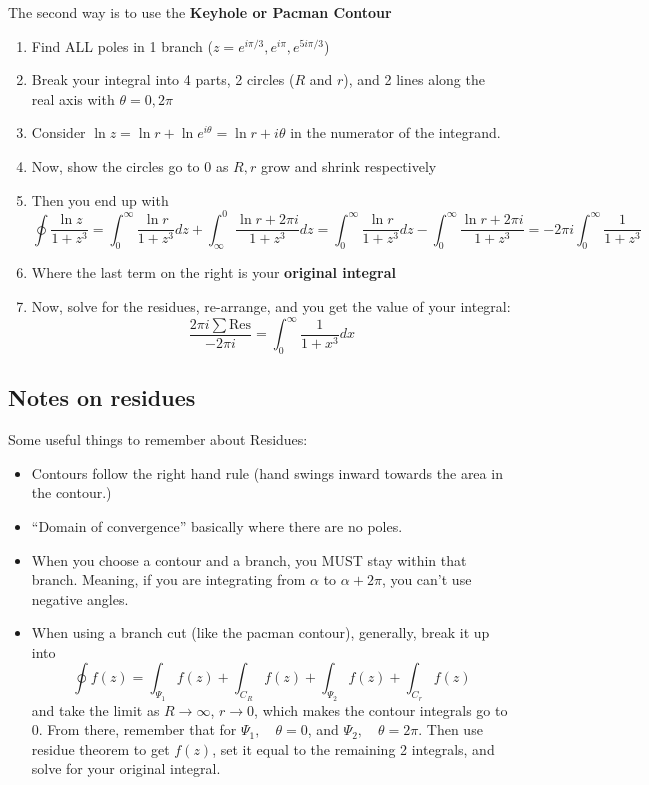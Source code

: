 \documentclass{article}
\begin{document}
The second way is to use the \textbf{Keyhole or Pacman Contour}

\begin{enumerate}
    \item Find ALL poles in 1 branch ($z = e^{i\pi/3}, e^{i\pi}, e^{5i\pi/3}$)
    \item Break your integral into 4 parts, 2 circles ($R$ and $r$), and 2 lines along the real axis with $\theta=0, 2\pi$
    \item Consider $\ln{z} = \ln{r} + \ln{e^{i\theta}} = \ln{r} + i\theta$ in the numerator of the integrand.
    \item Now, show the circles go to 0 as $R, r$ grow and shrink respectively
    \item Then you end up with 
    $$
    \oint \frac{\ln{z}}{1+z^3} = \int_{0}^{\infty} \frac{\ln{r}}{1+z^3} dz + \int_{\infty}^{0} \frac{\ln{r} + 2\pi i }{1+z^3} dz = \int_{0}^{\infty} \frac{\ln{r}}{1+z^3} dz - \int_{0}^{\infty} \frac{\ln{r} + 2\pi i }{1+z^3} = - 2\pi i \int_{0}^{\infty} \frac{1 }{1+z^3} 
    $$
    \item Where the last term on the right is your \textbf{original integral}
    \item Now, solve for the residues, re-arrange, and you get the value of your integral:
    $$
    \frac{2\pi i \sum \text{Res}}{-2\pi i} = \int_{0}^{\infty} \frac{1}{1+x^3} dx
    $$
\end{enumerate}

\subsection{Notes on residues}
Some useful things to remember about Residues:
\begin{itemize}
	\item Contours follow the right hand rule (hand swings inward towards the area in the contour.)
	\item ``Domain of convergence'' basically where there are no poles.
	\item When you choose a contour and a branch, you MUST stay within that branch.  Meaning, if you are integrating from $\alpha$ to $\alpha + 2\pi$, you can't use negative angles.  
	\item When using a branch cut (like the pacman contour), generally, break it up into
	      $$
	      \oint f(z) = \int_{\Psi_1} f(z) + \int_{C_R} f(z) + \int_{\Psi_{2}} f(z) + \int_{C_r} f(z)
	      $$
	      and take the limit as $R \to \infty$, $r \to 0$, which makes the contour integrals go to 0. From there, remember that for $\Psi_1,\quad \theta = 0$, and $\Psi_{2}, \quad \theta = 2\pi$.  Then use residue theorem to get $f(z)$, set it equal to the remaining 2 integrals, and solve for your original integral.
	          
\end{itemize}
\end{document}
